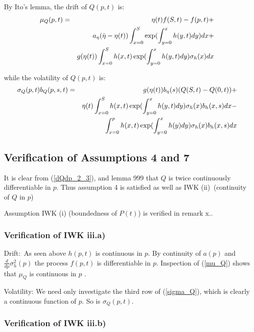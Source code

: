 \documentclass{article}
\begin{document}
By Ito's lemma, the drift of $Q(p,t)$ is:%
\begin{eqnarray}
\mu _{Q}(p,t) &=&\eta (t)f(S,t)-f(p,t)+  \label{mu_Q} \\
&&a_{\eta }(\bar{\eta}-\eta (t))\int_{x=0}^{S}\exp ({%
\int_{y=0}^{x}h(y,t)dy)dx+}  \notag \\
&&g(\eta (t))\int_{x=0}^{S}{h(x,t)}\exp ({\int_{y=0}^{x}h(y,t)dy)\sigma
_{h}(x)dx}  \notag
\end{eqnarray}

while the volatility of $Q(p,t)$ is:%
\begin{eqnarray}
\sigma _{Q}(p,t)b_{Q}(p,s,t) &=&g(\eta (t))b_{\eta }(s)(Q(S,t)-Q(0,t))+
\label{sigma_Q} \\
&&\eta (t)\int_{x=0}^{S}{h(x,t)}\exp ({\int_{y=0}^{x}h(y,t)dy)}\sigma
_{h}(x)b_{h}(x,s)dx-  \notag \\
&&\int_{x=0}^{p}{h(x,t)}\exp ({\int_{y=0}^{x}h(y)dy)}\sigma
_{h}(x)b_{h}(x,s)dx  \notag
\end{eqnarray}

\subsection{Verification of Assumptions 4 and 7}

It is clear from (\ref{dQdp_2_3}), and lemma 999 that $Q$ is twice
continuously differentiable in $p$. Thus assumption 4 is satisfied as well
as IWK (ii)\ (continuity of $Q$ in $p$)

Assumption IWK (i) (boundedness of $P(t)$) is verified in remark x..

\subsubsection{Verification of IWK iii.a)}

Drift:\ As seen above $h(p,t)$ is continuous in $p$.  By continuity of $a(p)$
and $\frac{d}{dp}\sigma _{h}^{2}(p)$ the process $f(p,t)$ is differentiable
in $p$. Inspection of (\ref{mu_Q}) shows that $\mu _{Q}$ is continuous in $p$%
.

Volatility: We need only investigate the third row of (\ref{sigma_Q}), which
is clearly a continuous function of $p$. So is $\sigma _{Q}(p,t)$.

\bigskip

\subsubsection{Verification of IWK iii.b)}
\end{document}
